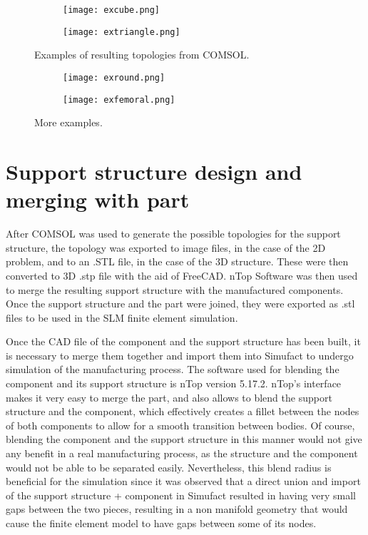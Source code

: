 \documentclass[../main.tex]{subfiles}
\begin{document}
\begin{figure}
  \begin{subfigure}{0.45\textwidth}
    \texttt{[image: excube.png]}
  \end{subfigure}
  \begin{subfigure}{0.45\textwidth}
      \texttt{[image: extriangle.png]}
    \end{subfigure}
    \caption{Examples of resulting topologies from COMSOL.}
  \end{figure}

\begin{figure}
  \begin{subfigure}{0.45\textwidth}
    \texttt{[image: exround.png]}
  \end{subfigure}
  \begin{subfigure}{0.45\textwidth}
      \texttt{[image: exfemoral.png]}
    \end{subfigure}
  \caption{More examples.}
\end{figure}

\section{Support structure design and merging with part}

After COMSOL was used to generate the possible topologies for the support structure, the topology was exported to image files, in the case of the 2D problem, and to an .STL file, in the case of the 3D structure. These were then converted to 3D .stp file with the aid of FreeCAD. nTop Software was then used to merge the resulting support structure with the manufactured components. Once the support structure and the part were joined, they were exported as .stl files to be used in the SLM finite element simulation.

Once the CAD file of the component and the support structure has been built, it is necessary to merge them together and import them into Simufact to undergo simulation of the manufacturing process. The software used for blending the component and its support structure is nTop version 5.17.2. nTop's interface makes it very easy to merge the part, and also allows to blend the support structure and the component, which effectively creates a fillet between the nodes of both components to allow for a smooth transition between bodies. Of course, blending the component and the support structure in this manner would not give any benefit in a real manufacturing process, as the structure and the component would not be able to be separated easily. Nevertheless, this blend radius is beneficial for the simulation since it was observed that a direct union and import of the support structure + component in Simufact resulted in having very small gaps between the two pieces, resulting in a non manifold geometry that would cause the finite element model to have gaps between some of its nodes.
\end{document}
